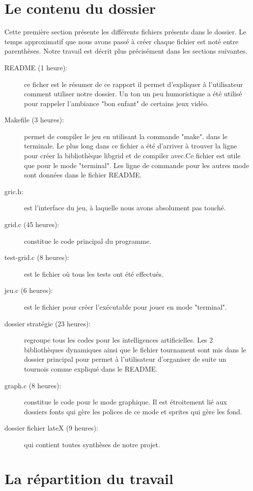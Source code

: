 \documentclass{report}
\begin{document}
\section{Le contenu du dossier}
Cette première section présente les différents fichiers présents dans le dossier. Le temps approximatif que nous avons passé à créer chaque fichier est noté entre parenthèses. Notre travail est décrit plus précisément dans les sections suivantes.\\
\begin{description}
\item [README (1 heure):] ce ficher est le résumer de ce rapport il permet d'expliquer à l'utilisateur comment utiliser notre dossier. Un ton un peu humoristique a été utilisé pour rappeler l'ambiance "bon enfant" de certains jeux vidéo.\\
\item[Makefile (3 heures):] permet de compiler le jeu en utilisant la commande "make". dans le terminale. Le plus long dans ce fichier a été d'arriver à trouver la ligne pour créer la bibliothèque libgrid et de compiler avec.Ce fichier est utile que pour le mode "terminal". Les ligne de commande pour les autres mode sont données dans le fichier README.
\item[gric.h:] est l'interface du jeu, à laquelle nous avons absolument pas touché.
\item[grid.c (45 heures):] constitue le code principal du programme. 
\item[test-grid.c (8 heures):] est le fichier où tous les tests ont été effectués.
\item[jeu.c (6 heures):] est le fichier pour créer l'exécutable pour jouer en mode "terminal".
\item[dossier stratégie (23 heures):] regroupe tous les codes pour les intelligences artificielles. Les 2 bibliothèques dynamiques ainsi que le fichier tournament sont mis dans le dossier principal pour permet à l'utilisateur d'organiser de suite un tournois comme expliqué dans le README.
\item[graph.c (8 heures):] constitue le code pour le mode graphique. Il est étroitement lié aux dossiers fonts qui gère les polices de ce mode et sprites qui gère les fond.
\item[dossier fichier lateX (9 heures):] qui contient toutes synthèses de notre projet.
\end{description}

\section{La répartition du travail}
\end{document}

